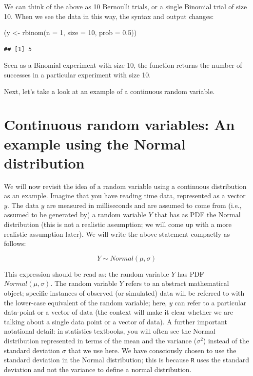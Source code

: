 \documentclass[
  12pt,
]{krantz}
\newenvironment{Shaded}{\begin{snugshade}}{\end{snugshade}}
\newcommand{\AttributeTok}[1]{\textcolor[rgb]{0.77,0.63,0.00}{#1}}
\newcommand{\DecValTok}[1]{\textcolor[rgb]{0.00,0.00,0.81}{#1}}
\newcommand{\FloatTok}[1]{\textcolor[rgb]{0.00,0.00,0.81}{#1}}
\newcommand{\FunctionTok}[1]{\textcolor[rgb]{0.00,0.00,0.00}{#1}}
\newcommand{\NormalTok}[1]{#1}
\newcommand{\OtherTok}[1]{\textcolor[rgb]{0.56,0.35,0.01}{#1}}
\theoremstyle{definition}
\theoremstyle{definition}
\theoremstyle{definition}
\theoremstyle{definition}
\theoremstyle{remark}
\begin{document}
We can think of the above as 10 Bernoulli trials, or a single Binomial trial of size 10. When we see the data in this way, the syntax and output changes:

\begin{Shaded}
\begin{Highlighting}[]
\NormalTok{(y }\OtherTok{\textless{}{-}} \FunctionTok{rbinom}\NormalTok{(}\AttributeTok{n =} \DecValTok{1}\NormalTok{, }\AttributeTok{size =} \DecValTok{10}\NormalTok{, }\AttributeTok{prob =} \FloatTok{0.5}\NormalTok{))}
\end{Highlighting}
\end{Shaded}

\begin{verbatim}
## [1] 5
\end{verbatim}

Seen as a Binomial experiment with size 10, the function returns the number of successes in a particular experiment with size 10.

Next, let's take a look at an example of a continuous random variable.

\hypertarget{continuous-random-variables-an-example-using-the-normal-distribution}{%
\section{Continuous random variables: An example using the Normal distribution}\label{continuous-random-variables-an-example-using-the-normal-distribution}}

We will now revisit the idea of a random variable using a continuous distribution as an example. Imagine that you have reading time data, represented as a vector \(y\). The data \(y\) are measured in milliseconds and are assumed to come from (i.e., assumed to be generated by) a random variable \(Y\) that has as PDF the Normal distribution (this is not a realistic assumption; we will come up with a more realistic assumption later). We will write the above statement compactly as follows:

\begin{equation}
Y \sim Normal(\mu,\sigma)
\end{equation}

This expression should be read as: the random variable \(Y\) has PDF \(Normal(\mu,\sigma)\). The random variable \(Y\) refers to an abstract mathematical object; specific instances of observed (or simulated) data will be referred to with the lower-case equivalent of the random variable; here, \(y\) can refer to a particular data-point or a vector of data (the context will make it clear whether we are talking about a single data point or a vector of data). A further important notational detail: in statistics textbooks, you will often see the Normal distribution represented in terms of the mean and the variance (\(\sigma^2\)) instead of the standard deviation \(\sigma\) that we use here. We have consciously chosen to use the standard deviation in the Normal distribution; this is because \texttt{R} uses the standard deviation and not the variance to define a normal distribution.
\end{document}
